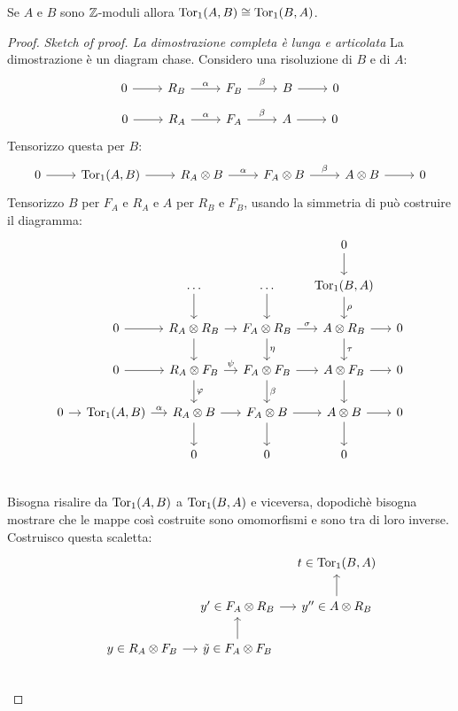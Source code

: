 \begin{proposition}
  Se $ A $ e $ B $ sono $ \mathbb{Z} $-moduli allora $ \mathrm{Tor_1}( A,B) \cong \mathrm{Tor_1}( B,A) $.
\end{proposition}
\begin{proof}\emph{Sketch of proof. La dimostrazione completa è lunga e articolata}
  La dimostrazione è un diagram chase.
  Considero una risoluzione di $ B $ e di $ A $:
  \[
    \begin{tikzcd}
      0 \rar{} & R_B \rar{\alpha} & F_B \rar{\beta} & B \rar & 0
    \end{tikzcd}
  \]
  \[
    \begin{tikzcd}
      0 \rar{} & R_A \rar{\alpha} & F_A \rar{\beta} & A \rar & 0
    \end{tikzcd}
  \]
  Tensorizzo questa per $ B $:
  \[
    \begin{tikzcd}
      0 \rar{} & \tor{A,B} \rar & R_A \otimes B \rar{\alpha} & F_A \otimes B \rar{\beta} & A \otimes B \rar & 0
    \end{tikzcd}
  \]
  Tensorizzo $ B $ per $ F_A $ e $ R_A $ e $ A $ per $ R_B $ e $ F_B $, usando
  la simmetria di può costruire il diagramma:
  \[
    \begin{tikzcd}[nodes={column sep= 10 pt}]
      {} & {} & {} & {} & 0 \dar & {} \\
      {} & {} & \dots \dar & \dots \dar & \tor{B,A} \dar{\rho} & {} \\
      {} & 0 \rar & R_A \otimes R_B \rar \dar & F_A \otimes R_B \dar{\eta} \rar{\sigma} & A \otimes R_B \dar{\tau}  \rar & 0 \\
      {} & 0 \rar & R_A \otimes F_B \rar{\psi} \dar{\phi} & F_A \otimes F_B \dar{\beta} \rar & A \otimes F_B \dar  \rar & 0 \\
      0 \rar & \tor{A,B} \rar{\alpha} & R_A \otimes B \rar \dar & F_A \otimes B \rar \dar & A \otimes B  \rar \dar & 0 \\
      {} & {} & 0 & 0 & 0 & {} \\
    \end{tikzcd}
  \]
  Bisogna risalire da $ \mathrm{Tor_1}( A,B) $ a $ \mathrm{Tor_1}( B,A) $ e viceversa, dopodichè bisogna mostrare
  che le mappe così costruite sono omomorfismi e sono tra di loro inverse.
  Costruisco questa scaletta:
  \[
    \begin{tikzcd}[nodes={column sep= 10 pt}]
      {} & {} & {} & t \in \tor{B,A}   \\
      {} & {} & y' \in F_A \otimes R_B \rar & y'' \in A \otimes R_B  \uar  \\
      {} & y \in R_A \otimes F_B \rar  & \tilde{y} \in F_A \otimes F_B \uar  &  {}  \\

\end{tikzcd}\]
\end{proof}
